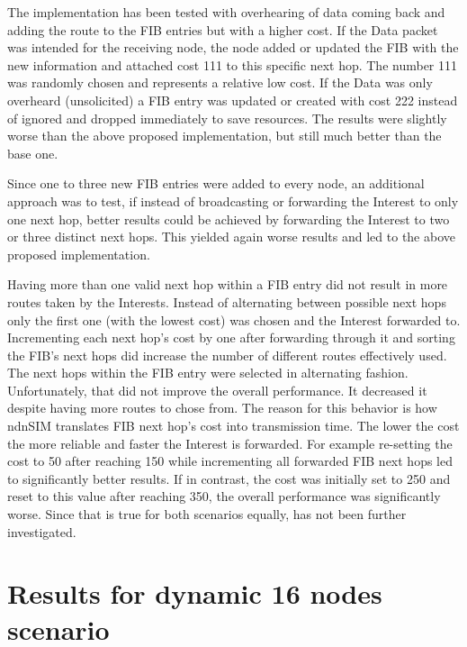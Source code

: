 The implementation has been tested with overhearing of data coming back and adding the route to the FIB entries but with a higher cost. If the Data packet was intended for the receiving node, the node added or updated the FIB with the new information and attached cost 111 to this specific next hop. The number 111 was randomly chosen and represents a relative low cost. If the Data was only overheard (unsolicited) a FIB entry was updated or created with cost 222 instead of ignored and dropped immediately to save resources. The results were slightly worse than the above proposed implementation, but still much better than the base one.

\vspace{5mm} %

Since one to three new FIB entries were added to every node, an additional approach was to test, if instead of broadcasting or forwarding the Interest to only one next hop, better results could be achieved by forwarding the Interest to two or three distinct next hops. This yielded again worse results and led to the above proposed implementation.

\vspace{5mm} %

Having more than one valid next hop within a FIB entry did not result in more routes taken by the Interests. Instead of alternating between possible next hops only the first one (with the lowest cost) was chosen and the Interest forwarded to. Incrementing each next hop's cost by one after forwarding through it and sorting the FIB's next hops did increase the number of different routes effectively used. The next hops within the FIB entry were selected in alternating fashion. Unfortunately, that did not improve the overall performance. It decreased it despite having more routes to chose from. The reason for this behavior is how ndnSIM translates FIB next hop's cost into transmission time. The lower the cost the more reliable and faster the Interest is forwarded. For example re-setting the cost to 50 after reaching 150 while incrementing all forwarded FIB next hops led to significantly better results. If in contrast, the cost was initially set to 250 and reset to this value after reaching 350, the overall performance was significantly worse. Since that is true for both scenarios equally, has not been further investigated.

\section{Results for dynamic 16 nodes scenario}

